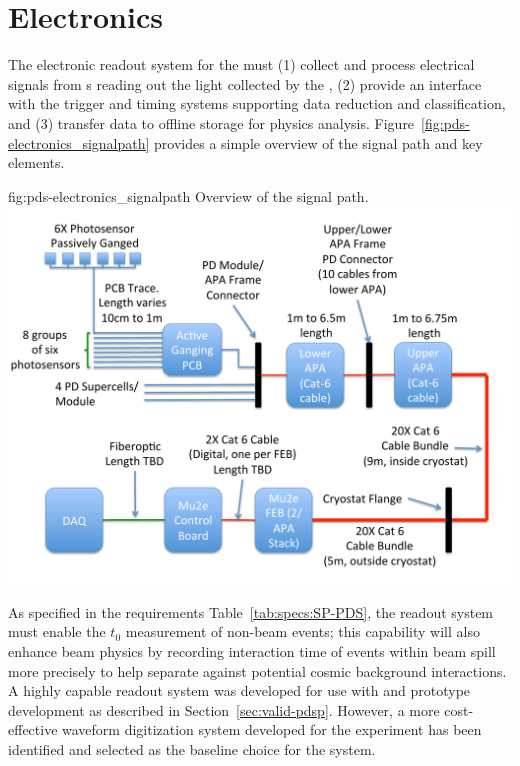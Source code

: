 
\section{Electronics}
\label{sec:fdsp-pd-pde}

The electronic readout system for the  must (1) collect and process electrical signals from s reading out the light collected by the , (2) provide an interface with the trigger and timing systems supporting data reduction and classification, and (3) transfer data to offline storage for physics analysis. Figure~\ref{fig:pds-electronics_signalpath} provides a simple overview of the signal path and key elements. 
\begin{dunefigure}
 {fig:pds-electronics_signalpath}
 {Overview of the  signal path.}
\includegraphics[width=15cm]{graphics/pds-signal-routing-diagram-r3.pdf}
\end{dunefigure}


As specified in the requirements Table~\ref{tab:specs:SP-PDS}, the readout system must enable the $t_0$ measurement of non-beam events; this capability will also enhance beam physics by recording interaction time of events within 
beam spill more precisely to help separate against potential cosmic background interactions. A highly capable readout system was developed for use with  and prototype development as described in Section~\ref{sec:valid-pdsp}. However, a more cost-effective waveform digitization system developed for the  experiment has been identified and selected as the baseline choice for the  system. 

